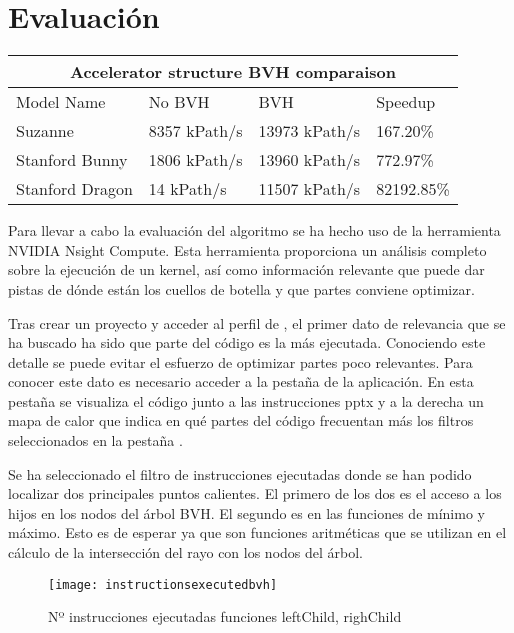 \chapter{Evaluación}
\label{chap:evaluation}
\label{chap:5}


\begin{tabular}{ |p{3cm}||p{3cm}|p{3cm}|p{3cm}| }
	 \hline
	 \multicolumn{4}{|c|}{Accelerator structure BVH comparaison} \\
	 \hline
	 Model Name&No BVH&BVH&Speedup\\
	 \hline
	 Suzanne   &8357 kPath/s&13973 kPath/s&167.20\%\\
	 Stanford Bunny &1806 kPath/s&13960 kPath/s&772.97\%\\
	 Stanford Dragon &14 kPath/s &11507 kPath/s&82192.85\%\\
	 \hline
\end{tabular}


Para llevar a cabo la evaluación del algoritmo se ha hecho uso de la herramienta NVIDIA Nsight Compute. Esta herramienta proporciona un análisis completo sobre la ejecución de un kernel, así como información relevante que puede dar pistas de dónde están los cuellos de botella y que partes conviene optimizar.

Tras crear un proyecto y acceder al perfil de , el primer dato de relevancia que se ha buscado ha sido que parte del código es la más ejecutada. Conociendo este detalle se puede evitar el esfuerzo de optimizar partes poco relevantes. Para conocer este dato es necesario acceder a la pestaña  de la aplicación. En esta pestaña se visualiza el código junto a las instrucciones pptx y a la derecha un mapa de calor que indica en qué partes del código frecuentan más los filtros seleccionados en la pestaña .

Se ha seleccionado el filtro de instrucciones ejecutadas donde se han podido localizar dos principales puntos calientes. El primero de los dos es el acceso a los hijos en los nodos del árbol BVH. El segundo es en las funciones de mínimo y máximo. Esto es de esperar ya que son funciones aritméticas que se utilizan en el cálculo de la intersección del rayo con los nodos del árbol.

\begin{figure}[H]
    \centering
	\texttt{[image: instructionsexecutedbvh]}
	\caption{Nº instrucciones ejecutadas funciones leftChild, righChild}
	\label{fig:label}
\end{figure}

